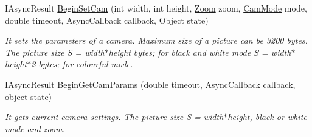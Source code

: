 \begin{DoxyCompactItemize}
  \item   IAsyncResult \hyperlink{class_elib_1_1_epuck_a55e442eec492fc282ae978b3ec1e78c2}{BeginSetCam} (int width, int height, \hyperlink{namespace_elib_af2af0734145f6e03503f2379f6249669}{Zoom} zoom, \hyperlink{namespace_elib_acc08cc9ecc6edea0df55bcb7a1529c17}{CamMode} mode, double timeout, AsyncCallback callback, Object state)
  \begin{DoxyCompactList}\small\item\em It sets the parameters of a camera. Maximum size of a picture can be 3200 bytes. The picture size S = width$\ast$height bytes; for black and white mode S = width$\ast$height$\ast$2 bytes; for colourful mode. \item\end{DoxyCompactList}

  \item   IAsyncResult \hyperlink{class_elib_1_1_epuck_aa9e87b03e5a8ec36db30b6340d0da861}{BeginGetCamParams} (double timeout, AsyncCallback callback, object state)
  \begin{DoxyCompactList}\small\item\em It gets current camera settings. The picture size S = width$\ast$height, black or white mode and zoom. \item\end{DoxyCompactList}

  \end{DoxyCompactItemize}

